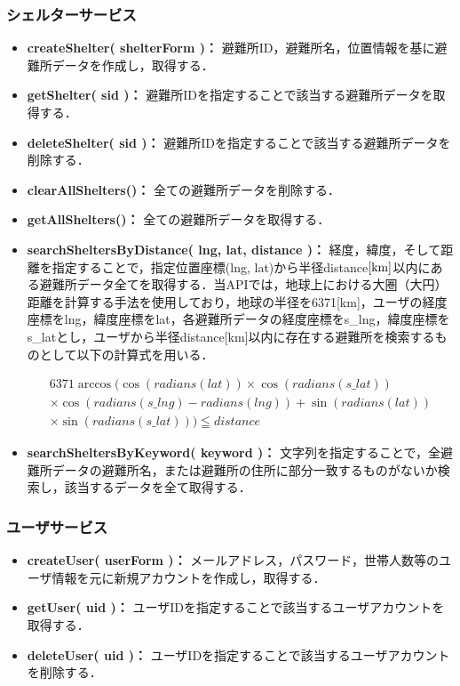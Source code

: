 \documentclass[technicalreport,dvipdfmx]{ieicej}
\begin{document}
\subsubsection{シェルターサービス}
\begin{itemize}
    \item{\textbf{createShelter( shelterForm )：}
         避難所ID，避難所名，位置情報を基に避難所データを作成し，取得する．}
    \item{\textbf{getShelter( sid )：}
         避難所IDを指定することで該当する避難所データを取得する．}
    \item{\textbf{deleteShelter( sid )：}
         避難所IDを指定することで該当する避難所データを削除する．}
    \item{\textbf{clearAllShelters()：}
         全ての避難所データを削除する．}
    \item{\textbf{getAllShelters()：}
         全ての避難所データを取得する．}
    \item{\textbf{searchSheltersByDistance( lng, lat, distance )：}
         経度，緯度，そして距離を指定することで，指定位置座標(lng, lat)から半径distance$\rm[km]$以内にある避難所データ全てを取得する．当APIでは，地球上における大圏（大円）距離を計算する手法を使用しており，地球の半径を6371[km]，ユーザの経度座標をlng，緯度座標をlat，各避難所データの経度座標をs\_lng，緯度座標をs\_latとし，ユーザから半径distance[km]以内に存在する避難所を検索するものとして以下の計算式を用いる．

         \begin{eqnarray*}
             6371 \arccos ( \cos( radians( lat ) ) \times \cos( radians( s\_lat ) ) \\
             \times \cos( radians( s\_lng ) - radians( lng ) ) + \sin( radians( lat ) ) \\
             \times \sin( radians( s\_lat ) ) ) \leqq distance
         \end{eqnarray*}}
    \item{\textbf{searchSheltersByKeyword( keyword )：}
         文字列を指定することで，全避難所データの避難所名，または避難所の住所に部分一致するものがないか検索し，該当するデータを全て取得する．}
\end{itemize}

\subsubsection{ユーザサービス}
\begin{itemize}
    \item{\textbf{createUser( userForm )：}
         メールアドレス，パスワード，世帯人数等のユーザ情報を元に新規アカウントを作成し，取得する．}
    \item{\textbf{getUser( uid )：}
         ユーザIDを指定することで該当するユーザアカウントを取得する．}
    \item{\textbf{deleteUser( uid )：}
         ユーザIDを指定することで該当するユーザアカウントを削除する．}
\end{itemize}
\end{document}
